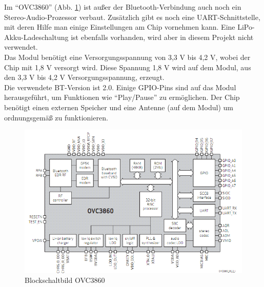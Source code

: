 \newpage
Im \enquote{OVC3860} (Abb. \ref {fig:3.3.2}) ist außer der Bluetooth-Verbindung auch noch ein Stereo-Audio-Prozessor verbaut.
Zusätzlich gibt es noch eine UART-Schnittstelle, mit deren Hilfe man einige Einstellungen am Chip vornehmen kann.
Eine LiPo-Akku-Ladeschaltung ist ebenfalls vorhanden, wird aber in diesem Projekt nicht verwendet.
\\
Das Modul benötigt eine Versorgungsspannung von 3,3 V bis 4,2 V, wobei der Chip mit 1,8 V versorgt wird.
Diese Spannung 1,8 V wird auf dem Modul, aus den 3,3 V bis 4,2 V Versorgungsspannung, erzeugt.
\\
Die verwendete BT-Version ist 2.0.
Einige GPIO-Pins sind auf das Modul herausgeführt, um Funktionen wie \enquote{Play/Pause} zu ermöglichen.
Der Chip benötigt einen externen Speicher und eine Antenne (auf dem Modul) um ordnungsgemäß zu funktionieren.
\begin{figure} [H]
	\centering
	\includegraphics[width=1\textwidth]{img/BTModul/blockschaltbild.png}
	\caption[Blockschaltbild OVC3860]{Blockschaltbild OVC3860\footnotemark}\label {fig:3.3.2}
\end{figure}

\newpage
